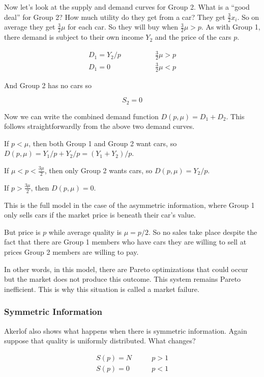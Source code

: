 \documentclass[11pt]{article}
\begin{document}
Now let's look at the supply and demand curves for Group 2. What is a ``good deal'' for Group 2? How much utility do they get from a car? They get $\frac{3}{2}x_i$. So on average they get $\frac{3}{2}\mu$ for each car. So they will buy when $\frac{3}{2}\mu > p$.
As with Group 1, there demand is subject to their own income $Y_2$ and the price of the cars $p$. 

\begin{align*}
D_1 = Y_2/p & \qquad \qquad \frac{3}{2}\mu > p \\
D_1 = 0 & \qquad \qquad \frac{3}{2}\mu < p
\end{align*}

And Group 2 has no cars so 

$$S_2 = 0$$

Now we can write the combined demand function $D(p, \mu) = D_1 + D_2$. This follows straightforwardly from the above two demand curves. 

If $p<\mu$, then both Group 1 and Group 2 want cars, so $D(p, \mu) = Y_1/p + Y_2/p = (Y_1 + Y_2)/p$.

If $\mu < p < \frac{3\mu}{2}$, then only Group 2 wants cars, so $D(p, \mu) = Y_2/p$.

If $ p > \frac{3\mu}{2}$, then $D(p, \mu) = 0$. 

This is the full model in the case of the asymmetric information, where Group 1 only sells cars if the market price is beneath their car's value. 

But price is $p$ while average quality is $\mu = p/2$. So no sales take place despite the fact that there are Group 1 members who have cars they are willing to sell at prices Group 2 members are willing to pay.

In other words, in this model, there are Pareto optimizations that could occur but the market does not produce this outcome. This system remains Pareto inefficient. This is why this situation is called a market failure.

\subsubsection{Symmetric Information}

Akerlof also shows what happens when there is symmetric information. Again suppose that quality is uniformly distributed. What changes? 

\begin{align*}
    S(p) = N & \qquad p > 1\\
    S(p) = 0 & \qquad p < 1
\end{align*}
\end{document}

